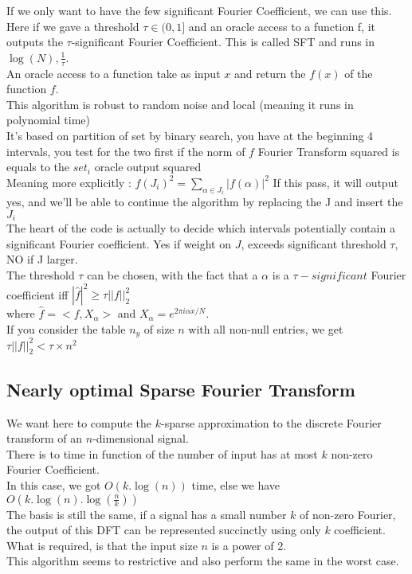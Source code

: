 \documentclass{article}
\begin{document}
If we only want to have the few significant Fourier Coefficient, we can use this.\\
Here if we gave a threshold $\tau \in (0,1]$ and an oracle access to a function f, it outputs the $\tau$-significant Fourier Coefficient. This is called SFT and runs in $\log(N),\frac{1}{\tau}$.\\
An oracle access to a function take as input $x$ and return the $f(x)$ of the function $f$.\\
This algorithm is robust to random noise and local (meaning it runs in polynomial time)\\
It's based on partition of set by binary search, you have at the beginning 4 intervals, you test for the two first if the norm of $f$ Fourier Transform squared is equals to the $set_i$ oracle output squared\\
Meaning more explicitly : $f(J_i)^2 = \sum_{\alpha \in J_i}{|f(\alpha)|^2}$ If this pass, it will output yes, and we'll be able to continue the algorithm by replacing the J and insert the $J_i$\\
The heart of the code is actually to decide which intervals potentially contain a significant Fourier coefficient. Yes if weight on $J$, exceeds significant threshold $\tau$, NO if J larger.\\
The threshold $\tau$ can be chosen, with the fact that a $\alpha$ is a $\tau -significant$ Fourier coefficient iff $|\hat{f}|^2 \geq \tau||f||^{2}_2$\\ where $\hat{f} = <f,X_{\alpha}>$ and $X_{\alpha} = e^{2\pi i \alpha x/N}$.\\
If you consider the table $n_y$ of size $n$ with all non-null entries, we get $\tau||f||^{2}_2 < \tau \times n^2$\\

\subsection{Nearly optimal Sparse Fourier Transform}

We want here to compute the $k$-sparse approximation to the discrete Fourier transform of an $n$-dimensional signal.\\
There is to time in function of the number of input has at most $k$ non-zero Fourier Coefficient.\\
In this case, we got $O(k.\log(n))$ time, else we have $O(k.\log(n).\log(\frac{n}{k}))$\\
The basis is still the same, if a signal has a small number $k$ of non-zero Fourier, the output of this DFT can be represented succinctly using only $k$ coefficient.\\
What is required, is that the input size $n$ is a power of 2.\\
This algorithm seems to restrictive and also perform the same in the worst case.\\
\end{document}

